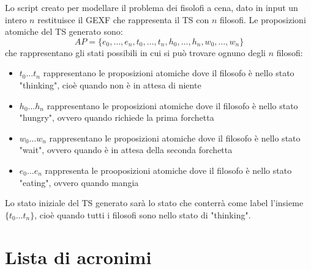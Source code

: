 \documentclass[a4paper, 10pt]{article}
\numberwithin{equation}{theor}
\begin{document}
Lo script creato per modellare il problema dei fisolofi a cena, dato in input un intero $n$ restituisce il \ac{GEXF} che rappresenta il \ac{TS} con $n$ filosofi.
Le proposizioni atomiche del \ac{TS} generato sono:
$$AP = \{e_0, \dots, e_n, t_0, \dots, t_n, h_0, \dots, h_n, w_0, \dots, w_n \}$$
che rappresentano gli stati possibili in cui si può trovare ognuno degli $n$ filosofi:
\begin{itemize}
  \item{$t_0 \dots t_n$ rappresentano le proposizioni atomiche dove il filosofo è nello stato "thinking", cioè quando non è in attesa di niente}
  \item{$h_0 \dots h_n$ rappresentano le proposizioni atomiche dove il filosofo è nello stato "hungry", ovvero quando richiede la prima forchetta}
  \item{$w_0 \dots w_n$ rappresentano le proposizioni atomiche dove il filosofo è nello stato "wait", ovvero quando è in attesa della seconda forchetta}
  \item{$e_0 \dots e_n$ rappresenta le prooposizioni atomiche dove il filosofo è nello stato "eating", ovvero quando mangia}
\end{itemize}
Lo stato iniziale del \ac{TS} generato sarà lo stato che conterrà come label l'insieme $\{t_0 \dots t_n\}$, cioè quando tutti i filosofi sono nello stato di "thinking".





\section*{Lista di acronimi}
\begin{acronym}
\end{acronym}
\end{document}
